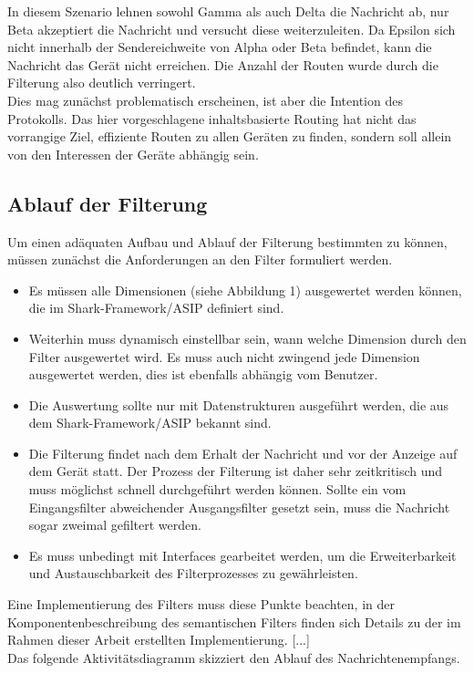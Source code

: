 In diesem Szenario lehnen sowohl Gamma als auch Delta die Nachricht ab, nur Beta akzeptiert die Nachricht und versucht diese weiterzuleiten. Da Epsilon sich nicht innerhalb der Sendereichweite von Alpha oder Beta befindet, kann die Nachricht das Gerät nicht erreichen. Die Anzahl der Routen wurde durch die Filterung also deutlich verringert. 
\\Dies mag zunächst problematisch erscheinen, ist aber die Intention des Protokolls. Das hier vorgeschlagene inhaltsbasierte Routing hat nicht das vorrangige Ziel, effiziente Routen zu allen Geräten zu finden, sondern soll allein von den Interessen der Geräte abhängig sein. 

\subsection{Ablauf der Filterung}
Um einen adäquaten Aufbau und Ablauf der Filterung bestimmten zu können, müssen zunächst die Anforderungen an den Filter formuliert werden.
\begin{itemize}
	\item Es müssen alle Dimensionen (siehe Abbildung 1) ausgewertet werden können, die im Shark-Framework/ASIP definiert sind.
	\item Weiterhin muss dynamisch einstellbar sein, wann welche Dimension durch den Filter ausgewertet wird. Es muss auch nicht zwingend jede Dimension ausgewertet werden, dies ist ebenfalls abhängig vom Benutzer.
	\item Die Auswertung sollte nur mit Datenstrukturen ausgeführt werden, die aus dem Shark-Framework/ASIP bekannt sind.
	\item Die Filterung findet nach dem Erhalt der Nachricht und vor der Anzeige auf dem Gerät statt. Der Prozess der Filterung ist daher sehr zeitkritisch und muss möglichst schnell durchgeführt werden können. Sollte ein vom Eingangsfilter abweichender Ausgangsfilter gesetzt sein, muss die Nachricht sogar zweimal gefiltert werden.
	\item Es muss unbedingt mit Interfaces gearbeitet werden, um die Erweiterbarkeit und Austauschbarkeit des Filterprozesses zu gewährleisten.
\end{itemize}
Eine Implementierung des Filters muss diese Punkte beachten, in der Komponentenbeschreibung des semantischen Filters finden sich Details zu der im Rahmen dieser Arbeit erstellten Implementierung. [...]
\\Das folgende Aktivitätsdiagramm skizziert den Ablauf des Nachrichtenempfangs.
